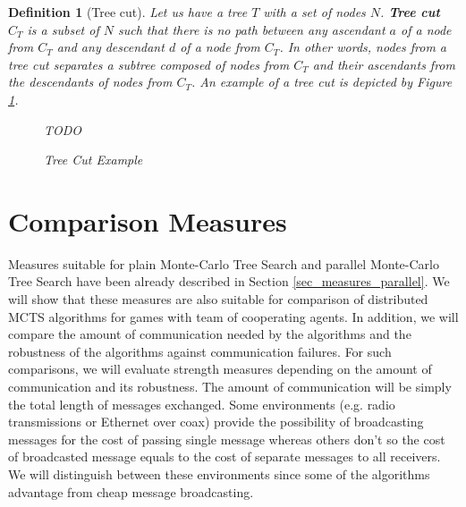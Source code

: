 \newtheorem*{deftreecut}{Definition}
\begin{deftreecut}[Tree cut]

Let us have a tree $T$ with a set of nodes $N$. \textbf{Tree cut} $C_T$ is a subset of $N$ such that
there is no path between any ascendant $a$ of a node from $C_T$ and any descendant $d$ of a node from
$C_T$. In other words, nodes from a tree cut separates a subtree composed of nodes from $C_T$ and
their ascendants from the descendants of nodes from $C_T$. An example of a tree cut is depicted by
Figure \ref{fig_tree_cut_example}.

\begin{figure}
\begin{center}
\end{center}
\caption{\footnotesize Tree Cut Example}{\footnotesize TODO}
\label{fig_tree_cut_example}
\end{figure}

\end{deftreecut}





\section{Comparison Measures}
\label{sec_measures_distributed}

Measures suitable for plain Monte-Carlo Tree Search and parallel
Monte-Carlo Tree Search have been already described in Section \ref{sec_measures_parallel}.
We will show that these
measures are also suitable for comparison of distributed MCTS algorithms for games with team
of cooperating agents. In addition, we will compare the amount of communication needed by the
algorithms and the robustness of the algorithms against communication failures. For such
comparisons, we will evaluate strength measures depending on the amount of communication and
its robustness. The amount of communication will be simply the total length of messages
exchanged. Some environments (e.g. radio transmissions or Ethernet over coax) provide the 
possibility of broadcasting messages for the cost of passing single message whereas others 
don't so the cost of broadcasted message equals to the cost of separate messages to all
receivers. We will distinguish between these
environments since some of the algorithms advantage from cheap message broadcasting.

